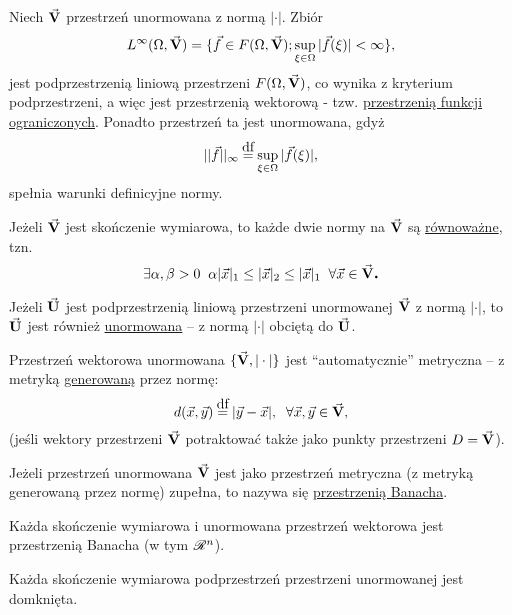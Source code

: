 \begin{example}
   Niech $\vec{\mathbf{V}}$ przestrzeń unormowana z normą $|\cdot|$. Zbiór
   \[L^\infty(\Omega, \vec{\mathbf{V}}) = \{\vec{f} \in F(\Omega, \vec{\mathbf{V}}); \sup \limits_{\xi \in \Omega} |\vec{f}(\xi)| < \infty\},\]
   jest podprzestrzenią liniową przestrzeni $F(\Omega, \vec{\mathbf{V}})$, co wynika z kryterium podprzestrzeni, a więc jest przestrzenią wektorową - tzw. \underline{przestrzenią funkcji ograniczonych}.
   Ponadto przestrzeń ta jest unormowana, gdyż 
   \[|| \vec{f} ||_\infty \df \sup \limits_{\xi\in\Omega} |\vec{f}(\xi)|,\]
   spełnia warunki definicyjne normy.
\end{example}

\begin{info} 
   Jeżeli $\vec{\mathbf{V}}$ jest skończenie wymiarowa, to każde dwie normy na $\vec{\mathbf{V}}$ są \underline{równoważne}, tzn. 
   \[\exists \alpha, \beta > 0 \;\; \alpha |\vec{x}|_1 \leq |\vec{x}|_2 \leq |\vec{x}|_1 \;\; \forall \vec{x} \in \vec{\mathbf{V}}\mbox{\large\bfseries .}\]
\end{info}

\begin{info}
   Jeżeli $\vec{\mathbf{U}}$ jest podprzestrzenią liniową przestrzeni unormowanej $\vec{\mathbf{V}}$ z normą $|\cdot|$, to $\vec{\mathbf{U}}$ jest również \underline{unormowana} -- z normą $|\cdot|$ obciętą do $\vec{\mathbf{U}}$.
\end{info}



\begin{tw}
   Przestrzeń wektorowa unormowana $\{ \vec{\mathbf{V}}, |\cdot|\}$ jest ``automatycznie'' metryczna -- z metryką \underline{generowaną} przez normę:
   \[d(\vec{x}, \vec{y}) \df |\vec{y} - \vec{x}|, \;\; \forall \vec{x}, \vec{y} \in \vset{V},\]
   (jeśli wektory przestrzeni $\vec{\mathbf{V}}$ potraktować także jako punkty przestrzeni $D = \vec{\mathbf{V}}$).
\end{tw} 

\begin{mydef}
   Jeżeli przestrzeń unormowana $\vec{\mathbf{V}}$ jest jako przestrzeń metryczna (z metryką generowaną przez normę) zupełna, to nazywa się \underline{przestrzenią Banacha}.
\end{mydef}

\begin{info}
   Każda skończenie wymiarowa i unormowana przestrzeń wektorowa jest przestrzenią Banacha (w tym $\mathscr{R}^n$).
\end{info}

\begin{info}
   Każda skończenie wymiarowa podprzestrzeń przestrzeni unormowanej jest domknięta.
\end{info}

